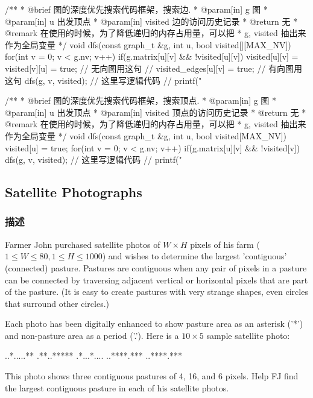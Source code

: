 \begin{Codex}[label=graph_dfs.cpp]
/**
 * @brief 图的深度优先搜索代码框架，搜索边.
 * @param[in] g 图
 * @param[in] u 出发顶点
 * @param[in] visited 边的访问历史记录
 * @return 无
 * @remark 在使用的时候，为了降低递归的内存占用量，可以把
 * g, visited 抽出来作为全局变量
 */
void dfs(const graph_t &g, int u, bool visited[][MAX_NV]) {
    for(int v = 0;  v < g.nv; v++) if(g.matrix[u][v] && !visited[u][v]) {
        visited[u][v] = visited[v][u] = true; // 无向图用这句
        // visited_edges[u][v] = true; // 有向图用这句
        dfs(g, v, visited);
        // 这里写逻辑代码
        // printf("%
    }
}

/**
 * @brief 图的深度优先搜索代码框架，搜索顶点.
 * @param[in] g 图
 * @param[in] u 出发顶点
 * @param[in] visited 顶点的访问历史记录
 * @return 无
 * @remark 在使用的时候，为了降低递归的内存占用量，可以把
 * g, visited 抽出来作为全局变量
 */
void dfs(const graph_t &g, int u, bool visited[MAX_NV]) {
    visited[u] = true;
    for(int v = 0;  v < g.nv; v++) if(g.matrix[u][v] && !visited[v]) {
        dfs(g, v, visited);
        // 这里写逻辑代码
        // printf("%
    }
}
\end{Codex}


\subsection{Satellite Photographs}

\subsubsection{描述}
Farmer John purchased satellite photos of $W \times H$ pixels of his farm ($1 \leq W \leq 80, 1 \leq H \leq 1000$) and wishes to determine the largest 'contiguous' (connected) pasture. Pastures are contiguous when any pair of pixels in a pasture can be connected by traversing adjacent vertical or horizontal pixels that are part of the pasture. (It is easy to create pastures with very strange shapes, even circles that surround other circles.) 

Each photo has been digitally enhanced to show pasture area as an asterisk ('*') and non-pasture area as a period ('.'). Here is a $10 \times 5$ sample satellite photo: 
\begin{Code}
..*.....** 
.**..***** 
.*...*.... 
..****.*** 
..****.*** 
\end{Code}

This photo shows three contiguous pastures of 4, 16, and 6 pixels. Help FJ find the largest contiguous pasture in each of his satellite photos.


